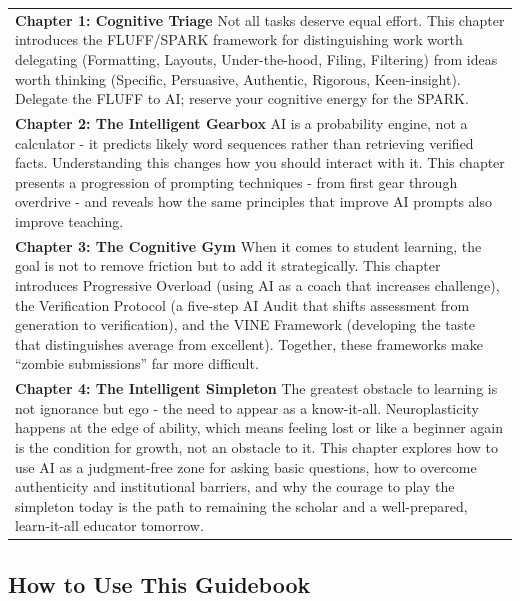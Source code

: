 \documentclass[
  letterpaper,
  DIV=11,
  numbers=noendperiod]{scrreprt}
\newcounter{none} %
\begin{document}
{\def\LTcaptype{none} %
\begin{longtable}[]{@{}
  >{\raggedright\arraybackslash}p{}@{}}
\toprule\noalign{}
\endhead
\bottomrule\noalign{}
\endlastfoot
\textbf{Chapter 1: Cognitive Triage} Not all tasks deserve equal effort.
This chapter introduces the FLUFF/SPARK framework for distinguishing
work worth delegating (Formatting, Layouts, Under-the-hood, Filing,
Filtering) from ideas worth thinking (Specific, Persuasive, Authentic,
Rigorous, Keen-insight). Delegate the FLUFF to AI; reserve your
cognitive energy for the SPARK. \\
\textbf{Chapter 2: The Intelligent Gearbox} AI is a probability engine,
not a calculator - it predicts likely word sequences rather than
retrieving verified facts. Understanding this changes how you should
interact with it. This chapter presents a progression of prompting
techniques - from first gear through overdrive - and reveals how the
same principles that improve AI prompts also improve teaching. \\
\textbf{Chapter 3: The Cognitive Gym} When it comes to student learning,
the goal is not to remove friction but to add it strategically. This
chapter introduces Progressive Overload (using AI as a coach that
increases challenge), the Verification Protocol (a five-step AI Audit
that shifts assessment from generation to verification), and the VINE
Framework (developing the taste that distinguishes average from
excellent). Together, these frameworks make ``zombie submissions'' far
more difficult. \\
\textbf{Chapter 4: The Intelligent Simpleton} The greatest obstacle to
learning is not ignorance but ego - the need to appear as a know-it-all.
Neuroplasticity happens at the edge of ability, which means feeling lost
or like a beginner again is the condition for growth, not an obstacle to
it. This chapter explores how to use AI as a judgment-free zone for
asking basic questions, how to overcome authenticity and institutional
barriers, and why the courage to play the simpleton today is the path to
remaining the scholar and a well-prepared, learn-it-all educator
tomorrow. \\
\end{longtable}
}

\subsection{How to Use This Guidebook}\label{how-to-use-this-guidebook}
\end{document}
